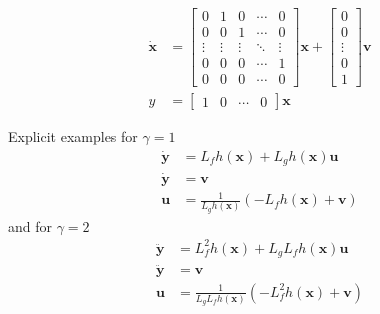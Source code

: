 \begin{align*}
    \dot{\mathbf{x}} & = \begin{bmatrix}
                    0      & 1      & 0      & \cdots & 0      \\
                    0      & 0      & 1      & \cdots & 0      \\
                    \vdots & \vdots & \vdots & \ddots & \vdots \\
                    0      & 0      & 0      & \cdots & 1      \\
                    0      & 0      & 0      & \cdots & 0
                \end{bmatrix}
    \mathbf{x} +
    \begin{bmatrix}
        0      \\
        0      \\
        \vdots \\
        0      \\
        1
    \end{bmatrix}
    \mathbf{v}                                                      \\
    y       & = \begin{bmatrix}
                    1 & 0 & \cdots & 0
                \end{bmatrix}
    \mathbf{x}
\end{align*}

\newpar{}
Explicit examples for $\gamma = 1$ %
\begin{align*}
    \dot{\mathbf{y}\mathbf{}} & = L_f h(\mathbf{x}) + L_g h(\mathbf{x}) \mathbf{u}             \\
    \dot{\mathbf{y}} & = \mathbf{v}                                 \\
    \mathbf{u}       & = \frac{1}{L_g h(\mathbf{x})}(-L_f h(\mathbf{x}) + \mathbf{v})
\end{align*}
and for $\gamma = 2$
\begin{align*}
    \ddot{\mathbf{y}} & = L_f^2 h(\mathbf{x}) + L_g L_f h(\mathbf{x}) \mathbf{u}             \\
    \ddot{\mathbf{y}} & = \mathbf{v}                                       \\
    \mathbf{u}        & = \frac{1}{L_g L_f h(\mathbf{x})}(-L_f^2 h(\mathbf{x}) + \mathbf{v})
\end{align*}

